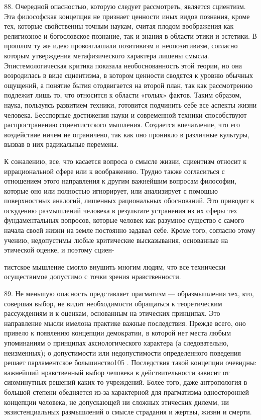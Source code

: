 \documentclass[a5paper,10pt]{article}
\begin{document}
88. Очередной опасностью, которую следует рассмотреть, является сциентизм. Эта
философская концепция не признает ценности иных видов познания, кроме тех,
которые свойственны точным наукам, считая плодом воображения как религиозное и
богословское познание, так и знания в области этики и эстетики. В прошлом ту же
идею провозглашали позитивизм и неопозитивизм, согласно которым утверждения
метафизического характера лишены смысла. Эпистемологическая критика показала
необоснованность этой теории, но она возродилась в виде сциентизма, в котором
ценности сводятся к уровню обычных ощущений, а понятие бытия отодвигается на
второй план, так как рассмотрению подлежит лишь то, что относится к области
«голых» фактов. Таким образом, наука, пользуясь развитием техники, готовится
подчинить себе все аспекты жизни человека. Бесспорные достижения науки и
современной техники способствуют распространению сциентистского мышления.
Создается впечатление, что его воздействие ничем не ограничено, так как оно
проникло в различные культуры, вызвав в них радикальные перемены.

К сожалению, все, что касается вопроса о смысле жизни, сциентизм относит к
иррациональной сфере или к воображению. Трудно также согласиться с отношением
этого направления к другим важнейшим вопросам философии, которые оно или
полностью игнорирует, или анализирует с помощью поверхностных аналогий,
лишенных рациональных обоснований. Это приводит к оскудению размышлений
человека в результате устранения из их сферы тех фундаментальных вопросов,
которые человек как разумное существо с самого начала своей жизни на земле
постоянно задавал себе. Кроме того, согласно этому учению, недопустимы любые
критические высказывания, основанные на этической оценке, и поэтому сциен-

тистское мышление смогло внушить многим людям, что все технически осуществимое
допустимо с точки зрения нравственности.

89. Не меньшую опасность представляет прагматизм — образмышления тех, кто,
совершая выбор, не видит необходимости обращаться к теоретическим рассуждениям
и к оценкам, основанным на этических принципах. Это направление мысли имелона
практике важные последствия. Прежде всего, оно привело к появлению концепции
демократии, в которой нет места любым упоминаниям о принципах аксиологического
характера (а следовательно, неизменных); о допустимости или недопустимости
определенного поведения решает парламентское большинство105 . Последствия такой
концепции очевидны: важнейший нравственный выбор человека в действительности
зависит от сиюминутных решений каких-то учреждений. Более того, даже
антропология в большой степени обедняется из-за характерной для прагматизма
односторонней концепции человека, не допускающей ни сложных этических дилемм,
ни экзистенциальных размышлений о смысле страдания и жертвы, жизни и смерти.
\end{document}
